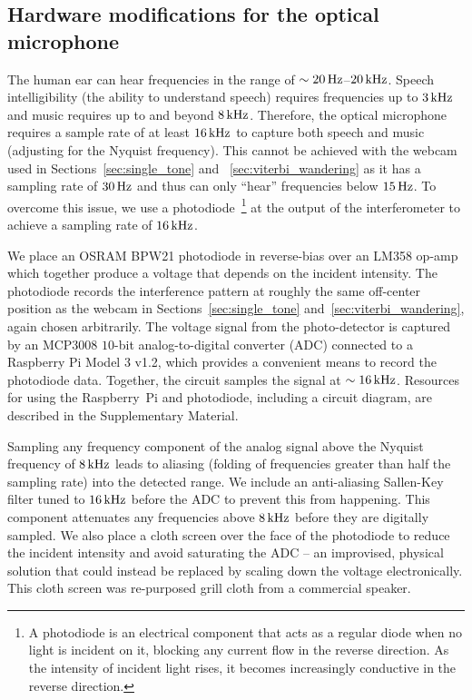 \documentclass[paper-main.tex]{subfiles}
\begin{document}
\subsection{Hardware modifications for the optical microphone}
\label{sec:photodiode}
The human ear can hear frequencies in the range of $\sim 20\,{\rm Hz}$--$20\,{\rm kHz}$. 
Speech intelligibility (the ability to understand speech) requires frequencies up to $3\,{\rm kHz}$ and music requires up to and beyond $8\,{\rm kHz}$. 
Therefore, the optical microphone requires a sample rate of at least $16\,{\rm kHz}$ to capture both speech and music (adjusting for the Nyquist frequency). 
This cannot be achieved with the webcam used in Sections~\ref{sec:single_tone} and ~\ref{sec:viterbi_wandering} as it has a sampling rate of $30\,{\rm Hz}$ and thus can only ``hear'' frequencies below $15\,{\rm Hz}$.
To overcome this issue, we use a photodiode~\footnote{A photodiode is an electrical component that acts as a regular diode when no light is incident on it, blocking any current flow in the reverse direction. As the intensity of incident light rises, it becomes increasingly conductive in the reverse direction.} at the output of the interferometer to achieve a sampling rate of $16\,{\rm kHz}$.

We place an OSRAM BPW21 photodiode in reverse-bias over an LM358 op-amp which together produce a voltage that depends on the incident intensity. 
The photodiode records the interference pattern at roughly the same off-center position as the webcam in Sections~\ref{sec:single_tone} and~\ref{sec:viterbi_wandering}, again chosen arbitrarily. 
The voltage signal from the photo-detector is captured by an MCP3008 $10$-bit analog-to-digital converter (ADC) connected to a Raspberry Pi Model 3 v1.2, which provides a convenient means to record the photodiode data.
Together, the circuit samples the signal at $\sim 16\,{\rm kHz}$. 
Resources for using the Raspberry~Pi and photodiode, including a circuit diagram, are described in the Supplementary Material.

Sampling any frequency component of the analog signal above the Nyquist frequency of $8\,{\rm kHz}$ leads to aliasing (folding of frequencies greater than half the sampling rate) into the detected range. We include an anti-aliasing Sallen-Key filter tuned to $16\,{\rm kHz}$ before the ADC to prevent this from happening.
This component attenuates any frequencies above $8\,{\rm kHz}$ before they are digitally sampled. We also place a cloth screen over the face of the photodiode to reduce the incident intensity and avoid saturating the ADC -- an improvised, physical solution that could instead be replaced by scaling down the voltage electronically. This cloth screen was re-purposed grill cloth from a commercial speaker.
\end{document}
